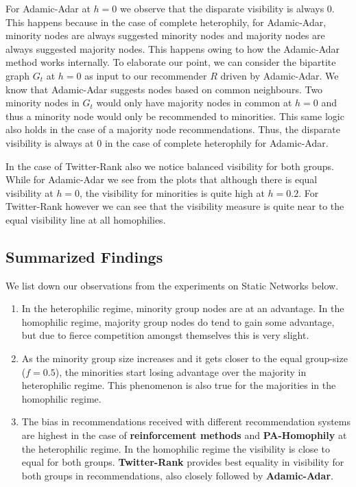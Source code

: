 For Adamic-Adar at $h=0$ we observe that the disparate visibility is always 0. This happens because in the case of complete heterophily, for Adamic-Adar, minority nodes are always suggested minority nodes and majority nodes are always suggested majority nodes. This happens owing to how the Adamic-Adar method works internally. To elaborate our point, we can consider the bipartite graph $G_t$ at $h=0$ as input to our recommender $R$ driven by Adamic-Adar. We know that Adamic-Adar suggests nodes based on common neighbours. Two minority nodes in $G_t$ would only have majority nodes in common at $h=0$ and thus a minority node would only be recommended to minorities. This same logic also holds in the case of a majority node recommendations. Thus, the disparate visibility is always at 0 in the case of complete heterophily for Adamic-Adar.

In the case of Twitter-Rank also we notice balanced visibility for both groups. While for Adamic-Adar we see from the plots that although there is equal visibility at $h=0$, the visibility for minorities is quite high at $h=0.2$. For Twitter-Rank however we can see that the visibility measure is quite near to the equal visibility line at all homophilies. 

\subsection{Summarized Findings}

We list down our observations from the experiments on Static Networks below.

\begin{enumerate}
	\item In the heterophilic regime, minority group nodes are at an advantage. In the homophilic regime, majority group nodes do tend to gain some advantage, but due to fierce competition amongst themselves this is very slight.
	
	\item As the minority group size increases and it gets closer to the equal group-size ($f=0.5$), the minorities start losing advantage over the majority in heterophilic regime. This phenomenon is also true for the majorities in the homophilic regime.
	
	\item The bias in recommendations received with different recommendation systems are highest in the case of \textbf{reinforcement methods} and \textbf{PA-Homophily} at the heterophilic regime. In the homophilic regime the visibility is close to equal for both groups. \textbf{Twitter-Rank} provides best equality in visibility for both groups in recommendations, also closely followed by \textbf{Adamic-Adar}.
	
\end{enumerate}

